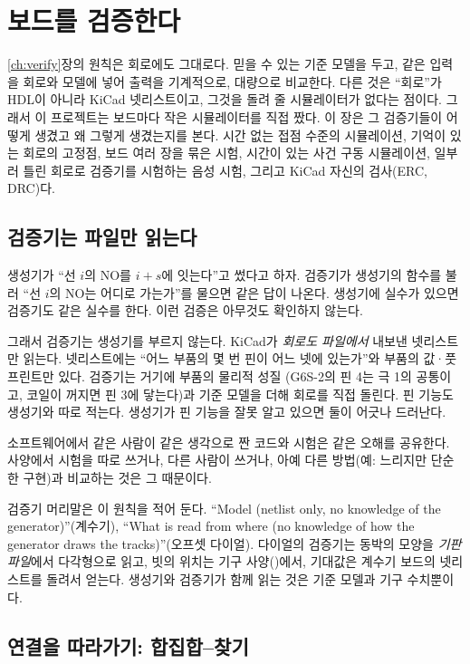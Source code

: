 \chapter{보드를 검증한다}\label{ch:boardverify}

\ref{ch:verify}장의 원칙은 회로에도 그대로다. 믿을 수 있는 기준 모델을 두고, 같은 입력을 회로와 모델에 넣어
출력을 기계적으로, 대량으로 비교한다. 다른 것은 ``회로''가 HDL이 아니라 KiCad 넷리스트이고, 그것을 돌려 줄
시뮬레이터가 없다는 점이다. 그래서 이 프로젝트는 보드마다 작은 시뮬레이터를 직접 짰다. 이 장은 그 검증기들이
어떻게 생겼고 왜 그렇게 생겼는지를 본다. 시간 없는 접점 수준의 시뮬레이션, 기억이 있는 회로의 고정점,
보드 여러 장을 묶은 시험, 시간이 있는 사건 구동 시뮬레이션, 일부러 틀린 회로로 검증기를 시험하는 음성
시험, 그리고 KiCad 자신의 검사(ERC, DRC)다.

\section{검증기는 파일만 읽는다}\label{sec:v-indep}

\Why 생성기가 ``선 $i$의 NO를 $i + s$에 잇는다''고 썼다고 하자. 검증기가 생성기의 함수를 불러 ``선 $i$의 NO는
어디로 가는가''를 물으면 같은 답이 나온다. 생성기에 실수가 있으면 검증기도 같은 실수를 한다. 이런 검증은 아무것도
확인하지 않는다.

그래서 검증기는 생성기를 부르지 않는다. KiCad가 \emph{회로도 파일에서} 내보낸 넷리스트만 읽는다. 넷리스트에는
``어느 부품의 몇 번 핀이 어느 넷에 있는가''와 부품의 값·풋프린트만 있다. 검증기는 거기에 부품의 물리적 성질
(G6S-2의 핀 4는 극 1의 공통이고, 코일이 꺼지면 핀 3에 닿는다)과 기준 모델을 더해 회로를 직접 돌린다. 핀 기능도
생성기와 따로 적는다. 생성기가 핀 기능을 잘못 알고 있으면 둘이 어긋나 드러난다.

\General 소프트웨어에서 같은 사람이 같은 생각으로 짠 코드와 시험은 같은 오해를 공유한다. 사양에서 시험을 따로
쓰거나, 다른 사람이 쓰거나, 아예 다른 방법(예: 느리지만 단순한 구현)과 비교하는 것은 그 때문이다.

\Ours 검증기 머리말은 이 원칙을 적어 둔다. ``Model (netlist only, no knowledge of the generator)''(계수기),
``What is read from where (no knowledge of how the generator draws the tracks)''(오프셋 다이얼). 다이얼의 검증기는
동박의 모양을 \emph{기판 파일}에서 다각형으로 읽고, 빗의 위치는 기구 사양()에서, 기대값은
계수기 보드의 넷리스트를 돌려서 얻는다. 생성기와 검증기가 함께 읽는 것은 기준 모델과 기구 수치뿐이다.

\section{연결을 따라가기: 합집합--찾기}\label{sec:v-uf}

